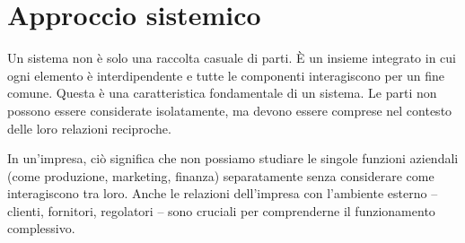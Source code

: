 \section{Approccio sistemico}
Un sistema non è solo una raccolta casuale di parti. È un insieme integrato in cui ogni elemento è interdipendente e tutte le componenti interagiscono per un fine comune. Questa è una caratteristica fondamentale di un sistema. Le parti non possono essere considerate isolatamente, ma devono essere comprese nel contesto delle loro relazioni reciproche.

In un’impresa, ciò significa che non possiamo studiare le singole funzioni aziendali (come produzione, marketing, finanza) separatamente senza considerare come interagiscono tra loro. Anche le relazioni dell’impresa con l’ambiente esterno – clienti, fornitori, regolatori – sono cruciali per comprenderne il funzionamento complessivo.

